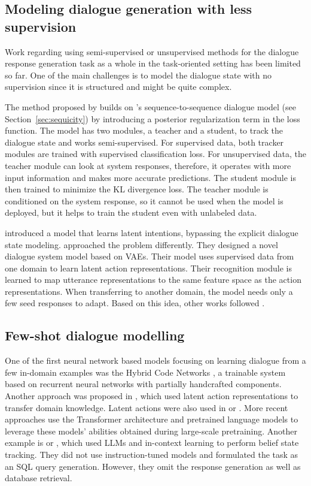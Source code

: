\subsection{Modeling dialogue generation with less supervision}
Work regarding using semi-supervised or unsupervised methods for the dialogue response generation task as a whole in the task-oriented setting has been limited so far.
One of the main challenges is to model the dialogue state with no supervision since it is structured and might be quite complex.

The method proposed by \citet{jin2018explicit} builds on \citet{lei2018sequicity}'s sequence-to-sequence dialogue model (see Section~\ref{sec:sequicity}) by introducing a posterior regularization term in the loss function.
The model has two modules, a teacher and a student, to track the dialogue state and works semi-supervised.
For supervised data, both tracker modules are trained with supervised classification loss.
For unsupervised data, the teacher module can look at system responses, therefore, it operates with more input information and makes more accurate predictions.
The student module is then trained to minimize the KL divergence loss.
The teacher module is conditioned on the system response, so it cannot be used when the model is deployed, but it helps to train the student even with unlabeled data.

\citet{wen2017latent} introduced a model that learns latent intentions, bypassing the explicit dialogue state modeling.
\citet{zhao-eskenazi-2018-zero} approached the problem differently.
They designed a novel dialogue system model based on VAEs.
Their model uses supervised data from one domain to learn latent action representations.
Their recognition module is learned to map utterance representations to the same feature space as the action representations.
When transferring to another domain, the model needs only a few seed responses to adapt.
Based on this idea, other works followed \citep{shalyminov-etal-2019-shot, huang2019mala}.

\subsection{Few-shot dialogue modelling}
One of the first neural network based models focusing on learning dialogue from a few in-domain examples was the Hybrid Code Networks  \cite{williams-etal-2017-hybrid}, a trainable system based on recurrent neural networks with partially handcrafted components.
Another approach was proposed in \citet{zhao-eskenazi-2018-zero}, which used latent action representations to transfer domain knowledge.
Latent actions were also used in \citet{huang2020mala} or \citet{shalyminov-etal-2019-data}.
More recent approaches use the Transformer architecture and pretrained language models \cite{shalyminov_fast_2020} to leverage these models' abilities obtained during large-scale pretraining.
Another example is \citet{madotto2020language} or
\citet{hu-etal-2022-context}, which used LLMs and in-context learning to perform belief state tracking.
They did not use instruction-tuned models and formulated the task as an SQL query generation.
However, they omit the response generation as well as database retrieval.